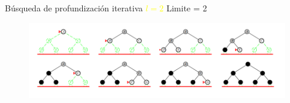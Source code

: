     \begin{frame}{Búsqueda de profundización iterativa \textcolor{Yellow}{$l=2$}}
        Limite = 2
        \begin{figure}\includegraphics[width =123mm]{64_IDS_l2.png}\end{figure}
    \end{frame}
